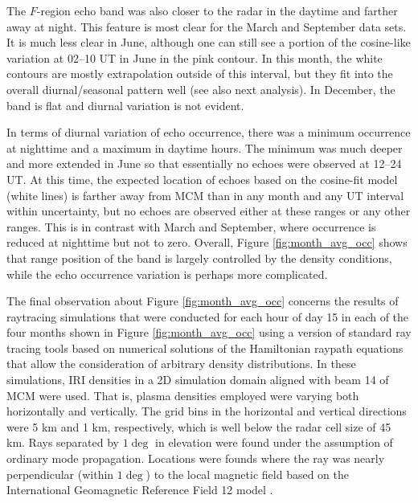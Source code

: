 The \(F\)-region echo band was also closer to the radar in the daytime and farther away at night. This feature is most clear for the March and September data sets. It is much less clear in June, although one can still see a portion of the cosine-like variation at 02--10 UT in June in the pink contour. In this month, the white contours are mostly extrapolation outside of this interval, but they fit into the overall diurnal/seasonal pattern well (see also next analysis).  In December, the band is flat and diurnal variation is not evident.

In terms of diurnal variation of echo occurrence, there was a minimum occurrence at nighttime and a maximum in daytime hours. The minimum was much deeper and more extended in June so that essentially no echoes were observed at 12--24 UT. At this time, the expected location of echoes based on the cosine-fit model (white lines) is farther away from MCM than in any month and any UT interval within uncertainty, but no echoes are observed either at these ranges or any other ranges. This is in contrast with March and September, where occurrence is reduced at nighttime but not to zero. Overall, Figure \ref{fig:month_avg_occ} shows that range position of the band is largely controlled by the density conditions, while the echo occurrence variation is perhaps more complicated.

The final observation about Figure \ref{fig:month_avg_occ} concerns the results of raytracing simulations that were conducted for each hour of day 15 in each of the four months shown in Figure \ref{fig:month_avg_occ} using a version of standard ray tracing tools based on numerical solutions of the Hamiltonian raypath equations \citep{Haselgrove1963,Jones1975} that allow the consideration of arbitrary density distributions. In these simulations, IRI densities in a 2D simulation domain aligned with beam 14 of MCM were used.  That is, plasma densities employed were varying both horizontally and vertically.  The grid bins in the horizontal and vertical directions were 5 km and 1 km, respectively, which is well below the radar cell size of 45 km.  Rays separated by \(1\deg\) in elevation were found under the assumption of ordinary mode propagation.  Locations were founds where the ray was nearly perpendicular (within \(1\deg\)) to the local magnetic field based on the International Geomagnetic Reference Field 12 model \citep{Thebault2015}.

